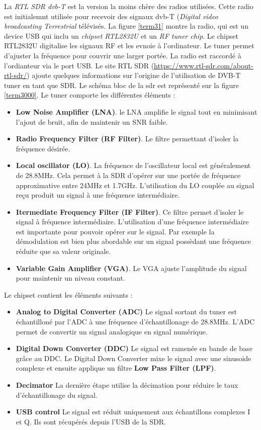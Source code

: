 La \textit{RTL SDR dvb-T} est la version la moins chère des radios utilisées. Cette radio est initialemnt utilisée pour recevoir des signaux dvb-T (\textit{Digital video broadcasting Terrestrial} télévisés. La figure \ref{term31} montre la radio, qui est un device USB qui inclu un \textit{chipset RTL2832U} et un \textit{RF tuner chip}. Le chipset RTL2832U digitalise les signaux RF et les evnoie à l'ordinateur. Le tuner permet d'ajuster la fréquence pour couvrir une larger portée.
La radio est raccordé à l'ordianteur via le port USB. Le site RTL SDR (\href{https://www.rtl-sdr.com/about-rtl-sdr/}{https://www.rtl-sdr.com/about-rtl-sdr/}) ajoute quelques informations sur l'origine de l'utilisation de DVB-T tuner en tant que SDR. Le schéma bloc de la sdr est représenté sur la figure \ref{term3000}. Le tuner comporte les différentes éléments :
\begin{itemize}
\item \textbf{Low Noise Amplifier (LNA)}. le LNA amplifie le signal tout en minimisant l'ajout de bruit, afin de maintenir un SNR faible.
\item \textbf{Radio Frequency Filter (RF Filter)}. Le filtre permettant d'isoler la fréquence désirée.
\item \textbf{Local oscillator (LO)}. La fréquence de l'oscillateur local est généralement de 28.8MHz. Cela permet à la SDR d'opérer sur une portée de fréquence approximative entre 24MHz et 1.7GHz. L'utilisation du LO couplée au signal reçu produit un signal à une fréquence intermédiaire.
\item \textbf{Itermediate Frequency Filter (IF Filter)}. Ce filtre permet d'isoler le signal à fréquence intermédiaire. L'utilisation d'une fréquence intermédiaire est importante pour pouvoir opérer sur le signal. Par exemple la démodulation est bien plus abordable sur un signal possèdant une fréquence réduite que sa valeur originale.
\item \textbf{Variable Gain Amplifier (VGA)}. Le VGA ajuste l'amplitude du signal pour maintenir un niveau constant.
\end{itemize}

\vspace{0.1cm}

Le chipset contient les éléments suivants :
\begin{itemize}
\item \textbf{Analog to Digital Converter (ADC)} Le signal sortant du tuner est échantilloné par l'ADC à une fréquence d'échantillonage de 28.8MHz. L'ADC permet de convertir un signal analogique en signal numérique.
\item \textbf{Digital Down Converter (DDC)} Le signal est ramenée en bande de base grâce au DDC. Le Digital Down Converter  mixe le signal avec une sinusoide complexe et ensuite applique un filtre \textbf{Low Pass Filter (LPF)}. 
\item \textbf{Decimator} La dernière étape utilise la décimation pour réduire le taux d'échantillonage du signal.
\item \textbf{USB control} Le signal est réduit uniquement aux échantillons complexes I et Q. Ils sont récupérés depuis l'USB de la SDR.
\end{itemize}


